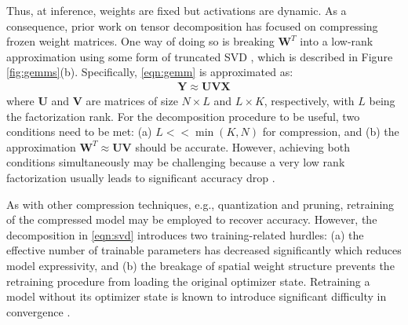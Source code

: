 \documentclass{article}
\theoremstyle{plain}
\begin{document}
Thus, at inference, weights are fixed but activations are dynamic. As a consequence, prior work on tensor decomposition has focused on compressing frozen weight matrices. One way of doing so is breaking $\mathbf{W}^T$ into a low-rank approximation using some form of truncated SVD \cite{yuan2023asvd,Badri_Shaji_2024}, which is described in Figure \ref{fig:gemms}(b). Specifically, \eqref{eqn:gemm} is approximated as:
\begin{align}
   \label{eqn:svd}
\mathbf{Y}\approx\mathbf{U} \mathbf{V} \mathbf{X}
\end{align}
where $\mathbf{U}$ and $\mathbf{V}$ are matrices of size $N\times L$ and $L\times K$, respectively, with $L$ being the factorization rank. For the decomposition procedure to be useful, two conditions need to be met: (a) $L<<\min(K,N)$ for compression, and (b) the approximation $\mathbf{W}^T\approx\mathbf{U} \mathbf{V}$ should be accurate. However, achieving both conditions simultaneously may be challenging because a very low rank factorization usually leads to significant accuracy drop \cite{zhao2024galore}.

As with other compression techniques, e.g., quantization and pruning, retraining of the compressed model may be employed to recover accuracy. However, the decomposition in \eqref{eqn:svd} introduces two training-related hurdles: (a) the effective number of trainable parameters has decreased significantly which reduces model expressivity, and (b) the breakage of spatial weight structure prevents the retraining procedure from loading the original optimizer state. Retraining a model without its optimizer state is known to introduce significant difficulty in convergence \cite{gu2022heat}.
\end{document}
